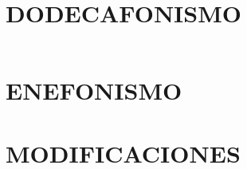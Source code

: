 \documentclass[12pt,twoside]{book}
\begin{document}
	\small
	\pagestyle{plain}
	\thispagestyle{empty}
	
    
    
    
	
	\pagestyle{fancy}
	
	\addtocounter{chapter}{-1}
	
	
	
    \part{DODECAFONISMO}

    
    
	
	

	\newpage$\ $
	\thispagestyle{empty}
	\cleardoublepage
    
	\part{ENEFONISMO}
	
	
    
    
    \part{MODIFICACIONES}
	
	
	
    
    
    
	\cleardoublepage
    
	

	\cleardoublepage
    
\end{document}
